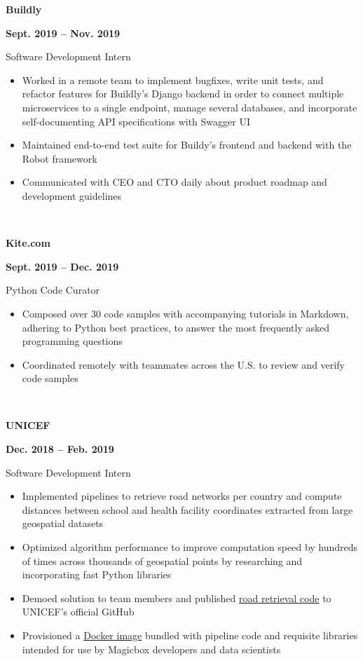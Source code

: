 \documentclass[letterpaper, 11pt]{article}
\newcommand{\expentry}[5]{

    \begin{minipage}[b]{0.5\textwidth}
        \raggedright
        \bf\large #3
        \end{minipage}%
        \begin{minipage}[b]{0.5\textwidth}
        \raggedleft
        \bf {#1} -- {#2}
        \end{minipage}

    \begin{minipage}[t]{\linewidth}
    \vspace{-3mm}
    #4
    \vspace{-1.75mm}
    \small{#5}
    \end{minipage}\\
    \vspace{1mm}
    }
\begin{document}
    
    \expentry{Sept. 2019}
    {Nov. 2019}
    {Buildly}
    {Software Development Intern}
    {
        \begin{itemize}
          \setlength\itemsep{-0.5mm}
          \item Worked in a remote team to implement bugfixes, write unit tests, and refactor features for Buildly's Django backend in order to connect multiple microservices to a single endpoint, manage several databases, and incorporate self-documenting API specifications with Swagger UI
          \item Maintained end-to-end test suite for Buildy's frontend and backend with the Robot framework
          \item Communicated with CEO and CTO daily about product roadmap and development guidelines
        \end{itemize}
        
    }

    \expentry{Sept. 2019}
    {Dec. 2019}
    {Kite.com}
    {Python Code Curator}
    {
        \begin{itemize}
          \setlength\itemsep{-0.5mm}
          \item Composed over 30 code samples with accompanying tutorials in Markdown, adhering to Python best practices, to answer the most frequently asked programming questions
          \item Coordinated remotely with teammates across the U.S. to review and verify code samples
         \end{itemize}
        
    }

    \expentry{Dec. 2018}
    {Feb. 2019}
    {UNICEF}
    {Software Development Intern}
    {
        \begin{itemize}{\leftmargin=0.5em \itemindent=0em}
          \setlength\itemsep{-0.5mm}
          \item Implemented pipelines to retrieve road networks per country and compute distances between school and health facility coordinates extracted from large geospatial datasets 
          \item Optimized algorithm performance to improve computation speed by hundreds of times across thousands of geospatial points by researching and incorporating fast Python libraries
          \item Demoed solution to team members and published \href{https://github.com/unicef/magicbox-download-roads}{road retrieval code} to UNICEF's official GitHub
          \item Provisioned a \href{https://hub.docker.com/r/msradam/magicbox-tools}{Docker image} bundled with pipeline code and requisite libraries intended for use by Magicbox developers and data scientists
        \end{itemize}
        
    }
\end{document}
